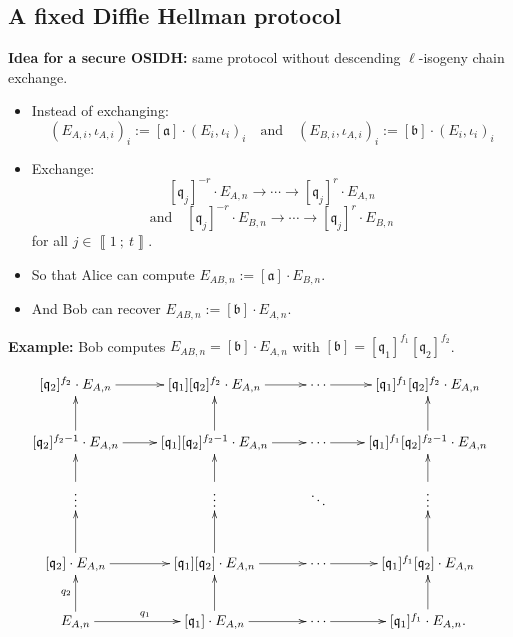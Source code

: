 \documentclass[10pt]{beamer}
\theoremstyle{plain}
\theoremstyle{definition}
\renewcommand{\i}[2]{\left\llbracket #1~;~#2\right\rrbracket}
\renewcommand{\(}{\left(}
\renewcommand{\)}{\right)}
\newcommand{\mf}[1]{\mathfrak{#1}}
\newcommand{\mfq}{\mathfrak{q}}
\begin{document}
\subsection{A fixed Diffie Hellman protocol}

\begin{frame}
\textbf{Idea for a secure OSIDH:} same protocol without descending $\ell$-isogeny chain exchange.

\vspace{0.5cm}

\begin{itemize}
\item Instead of exchanging:
\[(E_{A,i},\iota_{A,i})_{i}:=[\mf{a}]\cdot (E_i,\iota_i)_{i} \quad \mbox{and} \quad (E_{B,i},\iota_{A,i})_{i}:=[\mf{b}]\cdot (E_i,\iota_i)_{i}\]

\pause 
\item Exchange:
\[[\mfq_j]^{-r}\cdot E_{A,n}\longrightarrow \cdots\longrightarrow [\mfq_j]^{r}\cdot E_{A,n}\]
\[\mbox{and} \quad [\mfq_j]^{-r}\cdot E_{B,n}\longrightarrow \cdots\longrightarrow [\mfq_j]^{r}\cdot E_{B,n}\]
for all $j\in\i{1}{t}$.

\pause
\item So that Alice can compute $E_{AB,n}:=[\mf{a}]\cdot E_{B,n}$.
\item And Bob can recover $E_{AB,n}:=[\mf{b}]\cdot E_{A,n}$.
\end{itemize}

\end{frame}

\begin{frame}
\textbf{Example:} Bob computes $E_{AB,n}=[\mf{b}]\cdot E_{A,n}$ with $[\mf{b}]=[\mf{q}_1]^{f_1}[\mf{q}_2]^{f_2}$.

\[\xymatrix{
[\mf{q}_2]^{f_2}\cdot E_{A,n}  \ar[r] & [\mf{q}_1][\mf{q}_2]^{f_2}\cdot E_{A,n} \ar[r] & \cdots \ar[r] & [\mf{q}_1]^{f_1}[\mf{q}_2]^{f_2}\cdot E_{A,n}\\
[\mf{q}_2]^{f_2-1}\cdot E_{A,n}  \ar[u] \ar[r] & [\mf{q}_1][\mf{q}_2]^{f_2-1}\cdot E_{A,n} \ar[u] \ar[r] & \cdots \ar[r] & [\mf{q}_1]^{f_1}[\mf{q}_2]^{f_2-1}\cdot E_{A,n}\ar[u]\\
\vdots \ar[u] & \vdots \ar[u] & \ddots & \vdots \ar[u]\\
[\mf{q}_2]\cdot E_{A,n}  \ar[u] \ar[r] & [\mf{q}_1][\mf{q}_2]\cdot E_{A,n} \ar[u]\ar[r] & \cdots \ar[r] & [\mf{q}_1]^{f_1}[\mf{q}_2]\cdot E_{A,n} \ar[u] \\
E_{A,n} \ar[u]^{q_2} \ar[r]^{q_1} & [\mf{q}_1]\cdot E_{A,n} \ar[u] \ar[r] & \cdots  \ar[r] & [\mf{q}_1]^{f_1}\cdot E_{A,n}. \ar[u]
}\]

\end{frame}
\end{document}
